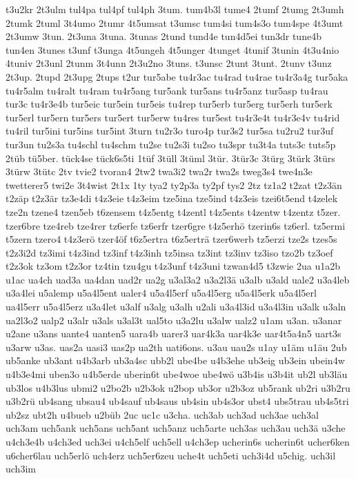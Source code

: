 {t3u2kr
2t3ulm
tul4pa
tul4pf
tul4ph
3tum.
tum4b3l
tume4
2tumf
2tumg
2t3umh
2tumk
2tuml
3t4umo
2tumr
4t5umsat
t3umsc
tum4si
tum4s3o
tum4spe
4t3umt
2t3umw
3tun.
2t3una
3tuna.
3tunas
2tund
tund4e
tun4d5ei
tun3dr
tune4b
tun4en
3tunes
t3unf
t3unga
4t5ungeh
4t5unger
4tunget
4tunif
3tunin
4t3u4nio
4tuniv
2t3unl
2tunm
3t4unn
2t3u2no
3tuns.
t3unsc
2tunt
3tunt.
2tunv
t3unz
2t3up.
2tupd
2t3upg
2tups
t2ur
tur5abe
tu4r3ac
tu4rad
tu4rae
tu4r3a4g
tur5aka
tu4r5alm
tu4ralt
tu4ram
tu4r5ang
tur5ank
tur5ans
tu4r5anz
tur5asp
tu4rau
tur3c
tu4r3e4b
tur5eic
tur5ein
tur5eis
tu4rep
tur5erb
tur5erg
tur5erh
tur5erk
tur5erl
tur5ern
tur5ers
tur5ert
tur5erw
tu4res
tur5est
tu4r3e4t
tu4r3e4v
tu4rid
tu4ril
tur5ini
tur5ins
tur5int
3turn
tu2r3o
turo4p
tur3s2
tur5sa
tu2ru2
tur3uf
tur3un
tu2s3a
tu4schl
tu4schm
tu2se
tu2s3i
tu2so
tu3spr
tu3t4a
tuts3c
tuts5p
2tüb
tü5ber.
tück4se
tück6s5ti
1tüf
3tüll
3tüml
3tür.
3tür3c
3türg
3türk
3türs
3türw
3tütc
2tv
tvie2
tvoran4
2tw2
twa3i2
twa2r
twa2s
tweg3s4
twe4n3e
twetterer5
twi2e
3t4wist
2t1x
1ty
tya2
ty2p3a
ty2pf
tys2
2tz
tz1a2
t2zat
t2z3än
t2zäp
t2z3är
tz3e4di
t4z3eie
t4z3eim
tze5ina
tze5ind
t4z3eis
tzei6t5end
t4zelek
tze2n
tzene4
tzen5eb
t6zensem
t4z5entg
t4zentl
t4z5ents
t4zentw
t4zentz
t5zer.
tzer6bre
tze4reb
tze4rer
tz6erfe
tz6erfr
tzer6gre
t4z5erhö
tzerin6s
tz6erl.
tz5ermi
t5zern
tzero4
t4z3erö
tzer4öf
t6z5ertra
t6z5erträ
tzer6werb
tz5erzi
tze2s
tzes5s
t2z3i2d
tz3imi
t4z3ind
tz3inf
t4z3inh
tz5insa
tz3int
tz3inv
tz3iso
tzo2b
tz3oef
t2z3ok
tz3om
t2z3or
tz4tin
tzu4gu
t4z3unf
t4z3uni
tzwan4d5
t3zwie
2ua
u1a2b
u1ac
ua4ch
uad3a
ua4dan
uad2r
ua2g
u3al3a2
u3a2l3ä
u3alb
u3ald
uale2
u3a4leb
u3a4lei
u5alemp
u5a4l5ent
ualer4
u5a4l5erf
u5a4l5erg
u5a4l5erk
u5a4l5erl
ua4l5err
u5a4l5erz
u3a4let
u3alf
u3alg
u3alh
u2ali
u3a4l3id
u3a4l3in
u3alk
u3aln
ua2l3o2
ualp2
u3alr
u3als
u3al3t
ual5to
u3a2lu
u3alw
ualz2
u1am
u3an.
u3anar
u2ane
u3ans
uante4
uanten5
uara4b
uarer3
uar4k3a
uar4k3e
uar4t5a4n5
uart3s
u3arw
u3as.
uas2a
uasi3
uas2p
ua2th
uati6ons.
u3au
uau2s
u1ay
u1äm
u1äu
2ub
ub5anke
ub3ant
u4b3arb
ub3a4sc
ubb2l
ube4be
u4b3ehe
ub3eig
ub3ein
ubein4w
u4b3e4mi
uben3o
u4b5erde
uberin6t
ube4woe
ube4wö
u3b4is
u3b4it
ub2l
ub3läu
ub3los
u4b3lus
ubmi2
u2bo2b
u2b3ok
u2bop
ub3or
u2b3oz
ub5rank
ub2ri
u3b2ru
u3b2rü
ub4sang
ubsau4
ub4sauf
ub4saus
ub4sin
ub4s3or
ubst4
ubs5trau
ub4s5tri
ub2sz
ubt2h
u4bueb
u2büb
2uc
uc1c
u3cha.
uch3ab
uch3ad
uch3ae
uch3al
uch3am
uch5ank
uch5ans
uch5ant
uch5anz
uch5arte
uch3as
uch3au
uch3ä
u3che
u4ch3e4b
u4ch3ed
uch3ei
u4ch5elf
uch5ell
u4ch3ep
ucherin6s
ucherin6t
ucher6ken
u6cher6lau
uch5erlö
uch4erz
uch5er6zeu
uche4t
uch5eti
uch3i4d
u5chig.
uch3il
uch3im
}
